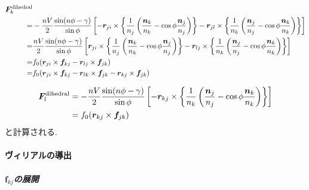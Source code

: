 \begin{align}
   \bm{F}_{k}^{\mathrm{dihedral}} &
 \notag
 \\
 =&
   -\frac{nV}{2} \frac{\sin(n\phi - \gamma)}{\sin{\phi}}
    \left[
          - \bm{r}_{ji} \times
            \left\{
            \frac{1}{n_{j}}
            \left(
                   \frac{\bm{n}_{k}}{n_{k}} - \cos\phi \frac{\bm{n}_{j}}{n_{j}}
            \right)
            \right\}
          -
            \bm{r}_{jl} \times
            \left\{
            \frac{1}{n_{k}}
            \left(
                   \frac{\bm{n}_{j}}{n_{j}} - \cos\phi \frac{\bm{n}_{k}}{n_{k}}
            \right)
            \right\}
    \right]
 \notag
 \\
 =&
    \frac{nV}{2} \frac{\sin(n\phi - \gamma)}{\sin{\phi}}
    \left[
            \bm{r}_{ji} \times
            \left\{
            \frac{1}{n_{j}}
            \left(
                   \frac{\bm{n}_{k}}{n_{k}} - \cos\phi \frac{\bm{n}_{j}}{n_{j}}
            \right)
            \right\}
          -
            \bm{r}_{lj} \times
            \left\{
            \frac{1}{n_{k}}
            \left(
                   \frac{\bm{n}_{j}}{n_{j}} - \cos\phi \frac{\bm{n}_{k}}{n_{k}}
            \right)
            \right\}
    \right]
 \notag
 \\
 =&
   f_{0} (\bm{r}_{ji} \times \bm{f}_{kj} - \bm{r}_{lj} \times \bm{f}_{jk})
 \notag
 \\
 =&
   f_{0} (  \bm{r}_{ji} \times \bm{f}_{kj}
          - \bm{r}_{lk} \times \bm{f}_{jk}
          - \bm{r}_{kj} \times \bm{f}_{jk})
 \notag
\end{align}

\begin{align}
   \bm{F}_{l}^{\mathrm{dihedral}}
 &=
   -\frac{nV}{2} \frac{\sin(n\phi - \gamma)}{\sin{\phi}}
    \left[
          - \bm{r}_{kj} \times
            \left\{
            \frac{1}{n_{k}}
            \left(
                   \frac{\bm{n}_{j}}{n_{j}} - \cos\phi \frac{\bm{n}_{k}}{n_{k}}
            \right)
            \right\}
    \right]
 \notag
 \\
 &=
   f_{0} (\bm{r}_{kj} \times \bm{f}_{jk})
 \notag
\end{align}
と計算される.

\paragraph{ヴィリアルの導出}
\subparagraph{$\bm{f}_{kj}$の展開} \

